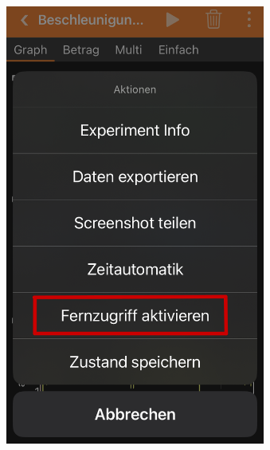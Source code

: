 \documentclass{beamer}
\begin{document}
\begin{frame}
\begin{columns}
        \begin{figure}[htpb]
            \centering
            \includegraphics[width=1\textwidth]{fernzugriff2}
        \end{figure}
        \begin{figure}[htpb]
            \centering

\end{figure}
\end{columns}
\end{frame}
\end{document}

